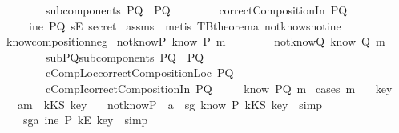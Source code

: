 \begin{isabellebody}
\ \ \ \ \ \ \ \ {\isachardoublequoteopen}subcomponents\ PQ\ {\isacharequal}\ {\isacharbraceleft}P{\isacharcomma}Q{\isacharbraceright}{\isachardoublequoteclose}\isanewline
\ \ \ \ \ \ \ \ {\isachardoublequoteopen}correctCompositionIn\ PQ{\isachardoublequoteclose}\isanewline
{}\ \ \ \ {\isachardoublequoteopen}{\isasymnot}\ {\isacharparenleft}ine\ PQ\ {\isacharparenleft}sE\ secret{\isacharparenright}{\isacharparenright}{\isachardoublequoteclose}\isanewline
\isadelimproof
\endisadelimproof
\isatagproof
{}\isamarkupfalse \ assms\ \isamarkupfalse \ {\isacharparenleft}metis\ TBtheorem{}a\ not{\isacharunderscore}know{\isacharunderscore}s{\isacharunderscore}not{\isacharunderscore}ine{\isacharparenright}\endisatagproof
{\isafoldproof}\isadelimproof
\isanewline
\endisadelimproof
\isanewline
{}\isamarkupfalse \ know{\isacharunderscore}composition{\isacharunderscore}neg{}{\isacharcolon}\isanewline
{}\ notknowP{\isacharcolon}{\isachardoublequoteopen}{\isasymnot}\ know\ P\ m{\isachardoublequoteclose}\isanewline
\ \ \ \ \ \ \ \ notknowQ{\isacharcolon}{\isachardoublequoteopen}{\isasymnot}\ know\ Q\ m{\isachardoublequoteclose}\isanewline
\ \ \ \ \ \ \ \ subPQ{\isacharcolon}{\isachardoublequoteopen}subcomponents\ PQ\ {\isacharequal}\ {\isacharbraceleft}P{\isacharcomma}Q{\isacharbraceright}{\isachardoublequoteclose}\isanewline
\ \ \ \ \ \ \ \ cCompLoc{\isacharcolon}{\isachardoublequoteopen}correctCompositionLoc\ PQ{\isachardoublequoteclose}\isanewline
\ \ \ \ \ \ \ \ cCompI{\isacharcolon}{\isachardoublequoteopen}correctCompositionIn\ PQ{\isachardoublequoteclose}\isanewline
{}\ \ \ \ {\isachardoublequoteopen}{\isasymnot}\ know\ PQ\ m{\isachardoublequoteclose}\isanewline
\isadelimproof
\endisadelimproof
\isatagproof
{}\isamarkupfalse \ {\isacharparenleft}cases\ m{\isacharparenright}\isanewline
\ \ \isamarkupfalse \ key\isanewline
\ \ \isamarkupfalse \ a{}{\isacharcolon}{\isachardoublequoteopen}m\ {\isacharequal}\ kKS\ key{\isachardoublequoteclose}\isanewline
\ \ \isamarkupfalse \ notknowP\ \ a{}\ \isamarkupfalse \ sg{}{\isacharcolon}{\isachardoublequoteopen}{\isasymnot}\ know\ P\ {\isacharparenleft}kKS\ key{\isacharparenright}{\isachardoublequoteclose}\ \isamarkupfalse \ simp\isanewline
\ \ \isamarkupfalse \ \isamarkupfalse \ sg{}a{\isacharcolon}{\isachardoublequoteopen}{\isasymnot}\ ine\ P\ {\isacharparenleft}kE\ key{\isacharparenright}{\isachardoublequoteclose}\ \isamarkupfalse \ simp\isanewline

\end{isabellebody}
